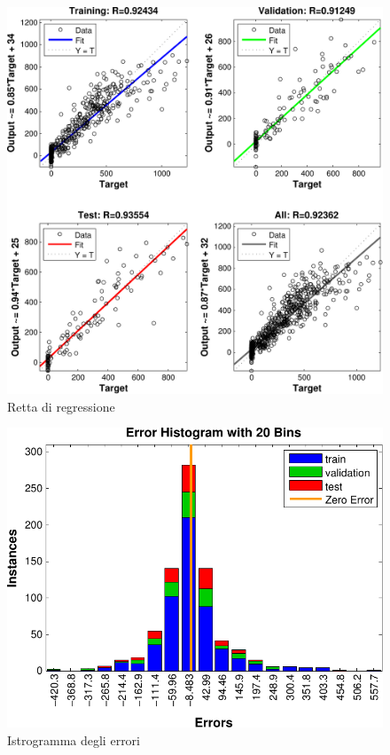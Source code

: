\begin{figure}[htbp]
  \centering
  \includegraphics[scale=0.5]{images/timeseries/inlight/regressions.pdf}
  \caption{Retta di regressione}
\end{figure}

\begin{figure}[htbp]
  \centering
  \includegraphics[scale=0.5]{images/timeseries/inlight/histogram.pdf}
  \caption{Istrogramma degli errori}
\end{figure}

